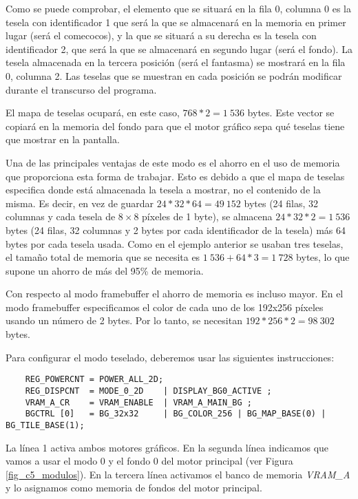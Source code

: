 Como se puede comprobar, el elemento que se situará en la fila 0, columna 0 es la tesela con identificador 1 que será la que se almacenará en la memoria en primer lugar (será el comecocos), y la que se situará a su derecha es la tesela con identificador 2, que será la que se almacenará en segundo lugar (será el fondo). La tesela almacenada en la tercera posición (será el fantasma) se mostrará en la fila 0, columna 2. Las teselas que se muestran en cada posición se podrán modificar durante el transcurso del programa.

El mapa de teselas ocupará, en este caso, $768*2=1\ 536$ bytes. Este vector se copiará en la memoria del fondo para que el motor gráfico sepa qué teselas tiene que mostrar en la pantalla.

Una de las principales ventajas de este modo es el ahorro en el uso de memoria que proporciona esta forma de trabajar. Esto es debido a que el mapa de teselas especifica donde está almacenada la tesela a mostrar, no el contenido de la misma. Es decir, en vez de guardar $24*32*64 = 49\ 152$ bytes (24 filas, 32 columnas y cada tesela de $8\times8$ píxeles de 1 byte), se almacena $24*32*2 = 1\ 536$ bytes (24 filas, 32 columnas y 2 bytes por cada identificador de la tesela) más 64 bytes por cada tesela usada. Como en el ejemplo anterior se usaban tres teselas, el tamaño total de memoria que se necesita es $1\ 536 + 64*3 = 1\ 728$ bytes, lo que supone un ahorro de más del 95\% de memoria.

Con respecto al modo framebuffer el ahorro de memoria es incluso mayor. En el modo framebuffer especificamos el color de cada uno de los 192x256 píxeles usando un número de 2 bytes. Por lo tanto, se necesitan $192*256*2=98\ 302$ bytes. 

Para configurar el modo teselado, deberemos usar las siguientes instrucciones:

\begin{lstlisting}
	REG_POWERCNT = POWER_ALL_2D;
	REG_DISPCNT  = MODE_0_2D    | DISPLAY_BG0_ACTIVE ;
	VRAM_A_CR    = VRAM_ENABLE  | VRAM_A_MAIN_BG ;
	BGCTRL [0]   = BG_32x32     | BG_COLOR_256 | BG_MAP_BASE(0) | BG_TILE_BASE(1);
\end{lstlisting}

La línea 1 activa ambos motores gráficos. En la segunda línea indicamos que vamos a usar el modo 0 y el fondo 0 del motor principal (ver Figura \ref{fig_c5_modulos}). En la tercera línea activamos el banco de memoria \textit{VRAM\_A} y lo asignamos como memoria de fondos del motor principal. 


